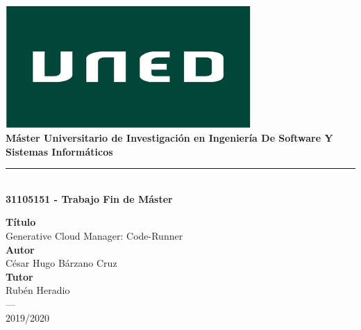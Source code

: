 \begin{titlepage}
 
 
\newlength{\centeroffset}
\setlength{\centeroffset}{-0.5\oddsidemargin}
\addtolength{\centeroffset}{0.5\evensidemargin}
\thispagestyle{empty}

\noindent\hspace*{\centeroffset}\begin{minipage}{\textwidth}

\centering
\includegraphics[width=0.7\textwidth]{imagenes/Logo-uned.jpg}\\[1.1cm]

{\Huge\bfseries Máster Universitario de Investigación en Ingeniería De Software Y Sistemas Informáticos\\
}
\noindent\rule[-1ex]{\textwidth}{3pt}\\[3.5ex]
{\large\bfseries 31105151 - Trabajo Fin de Máster}
\end{minipage}

\vspace{2.5cm}
\noindent\hspace*{\centeroffset}\begin{minipage}{\textwidth}
\centering

\textbf{Título}\\ {Generative Cloud Manager: Code-Runner}\\[3.5ex]
\textbf{Autor}\\ {César Hugo Bárzano Cruz}\\[2.5ex]
\textbf{Tutor}\\ {Rubén Heradio}\\[2.5ex]



\textsc{---}\\
2019/2020
\end{minipage}
\end{titlepage}


